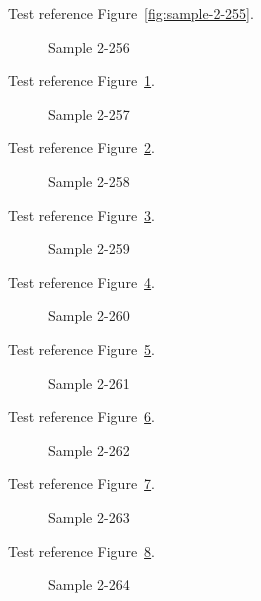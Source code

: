Test reference Figure~\ref{fig:sample-2-255}.

\begin{figure}[tbhp]
\caption{Sample 2-256}
\label{fig:sample-2-256}
\end{figure}

Test reference Figure~\ref{fig:sample-2-256}.

\begin{figure}[tbhp]
\caption{Sample 2-257}
\label{fig:sample-2-257}
\end{figure}

Test reference Figure~\ref{fig:sample-2-257}.

\begin{figure}[tbhp]
\caption{Sample 2-258}
\label{fig:sample-2-258}
\end{figure}

Test reference Figure~\ref{fig:sample-2-258}.

\begin{figure}[tbhp]
\caption{Sample 2-259}
\label{fig:sample-2-259}
\end{figure}

Test reference Figure~\ref{fig:sample-2-259}.

\begin{figure}[tbhp]
\caption{Sample 2-260}
\label{fig:sample-2-260}
\end{figure}

Test reference Figure~\ref{fig:sample-2-260}.

\begin{figure}[tbhp]
\caption{Sample 2-261}
\label{fig:sample-2-261}
\end{figure}

Test reference Figure~\ref{fig:sample-2-261}.

\begin{figure}[tbhp]
\caption{Sample 2-262}
\label{fig:sample-2-262}
\end{figure}

Test reference Figure~\ref{fig:sample-2-262}.

\begin{figure}[tbhp]
\caption{Sample 2-263}
\label{fig:sample-2-263}
\end{figure}

Test reference Figure~\ref{fig:sample-2-263}.

\begin{figure}[tbhp]
\caption{Sample 2-264}
\label{fig:sample-2-264}
\end{figure}

